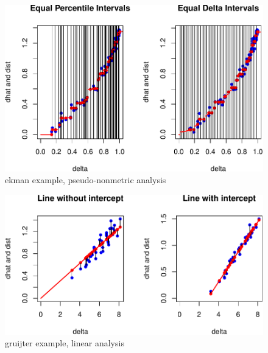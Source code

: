\documentclass[
  12pt,
]{article}
\begin{document}
\begin{figure}

{\centering \includegraphics{smacofBS_files/figure-latex/ekmanordinal-1} 

}

\caption{ekman example, pseudo-nonmetric analysis}\label{fig:ekmanordinal}
\end{figure}

\begin{figure}

{\centering \includegraphics{smacofBS_files/figure-latex/gruijterlinear-1} 

}

\caption{gruijter example, linear analysis}\label{fig:gruijterlinear}
\end{figure}
\end{document}
